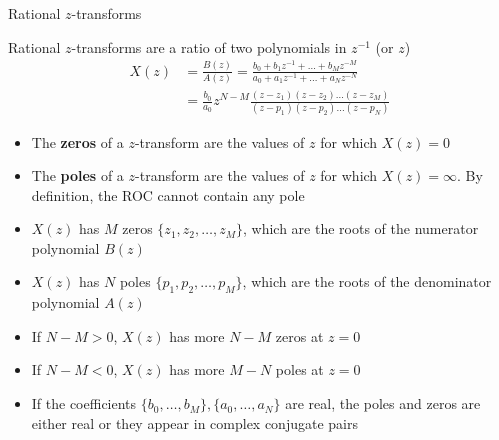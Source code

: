 \documentclass[10pt, handout]{beamer}
\begin{document}
%
\begin{frame}{Rational $z$-transforms}
	
Rational $z$-transforms are a ratio of two polynomials in $z^{-1}$ (or $z$)
\begin{align*}
	X(z) &= \frac{B(z)}{A(z)} = \frac{b_0 + b_1z^{-1}+\ldots+b_Mz^{-M}}{a_0 + a_1z^{-1}+\ldots+a_Nz^{-N}} \\
	&= \frac{b_0}{a_0}z^{N-M}\frac{(z-z_1)(z-z_2)\ldots(z-z_M)}{(z-p_1)(z-p_2)\ldots(z-p_N)}
\end{align*}
\begin{itemize}
	\pause\item The \textbf{zeros} of a $z$-transform are the values of $z$ for which $X(z) = 0$
	\pause\item The \textbf{poles} of a $z$-transform are the values of $z$ for which $X(z) = \infty$. By definition, the ROC cannot contain any pole
	\pause\item $X(z)$ has $M$ zeros $\{z_1, z_2, \ldots, z_M\}$, which are the roots of the numerator polynomial $B(z)$
	\pause\item $X(z)$ has $N$ poles $\{p_1, p_2, \ldots, p_M\}$, which are the roots of the denominator polynomial $A(z)$
	\pause\item If $N-M > 0$, $X(z)$ has more $N-M$ zeros at $z = 0$
	\pause\item If $N-M < 0$, $X(z)$ has more $M-N$ poles at $z = 0$
	\pause\item If the coefficients $\{b_0, \ldots, b_M\}, \{a_0, \ldots, a_N\}$ are real, the poles and zeros are either real or they appear in complex conjugate pairs
\end{itemize}	
\end{frame}
\end{document}
